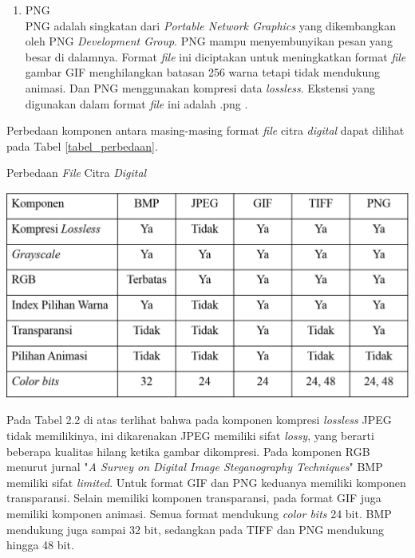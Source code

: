 \begin{enumerate}
			\item PNG\\
			PNG adalah singkatan dari \emph{Portable Network Graphics} yang dikembangkan oleh PNG \emph{Development Group}. PNG mampu menyembunyikan pesan yang besar di dalamnya. Format \emph{file} ini diciptakan untuk meningkatkan format \emph{file} gambar GIF menghilangkan batasan 256 warna tetapi tidak mendukung animasi. Dan PNG menggunakan kompresi data \emph{lossless}. Ekstensi yang digunakan dalam format \emph{file} ini adalah .png \cite{gautam}.
		\end{enumerate}
	Perbedaan komponen antara masing-masing format \emph{file} citra \emph{digital} dapat dilihat pada Tabel \ref{tabel_perbedaan}. \cite{gautam}
	\begin{table}[H]
		\centering
		\caption{Perbedaan \emph{File} Citra \emph{Digital} \cite{gautam}}
		\includegraphics[width=1.0\textwidth]{gambar/table_perbedaan2}
		\label{tabel_perbedaan}
	\end{table}

	Pada Tabel 2.2 di atas terlihat bahwa pada komponen kompresi \emph{lossless} JPEG tidak memilikinya, ini dikarenakan JPEG memiliki sifat \emph{lossy}, yang berarti beberapa kualitas hilang ketika gambar dikompresi. Pada komponen RGB menurut jurnal "\emph{A Survey on Digital Image Steganography Techniques}" BMP memiliki sifat \emph{limited}. Untuk format GIF dan PNG keduanya memiliki komponen transparansi. Selain memiliki komponen transparansi, pada format GIF juga memiliki komponen animasi. Semua format mendukung \emph{color bits} 24 bit. BMP mendukung juga sampai 32 bit, sedangkan pada TIFF dan PNG mendukung hingga 48 bit.

